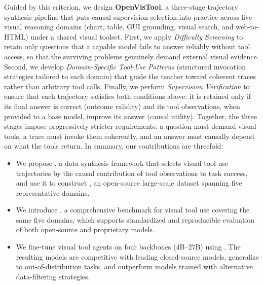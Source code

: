 Guided by this criterion, we design \textbf{OpenVisTool}, a three-stage trajectory synthesis pipeline that puts causal supervision selection into practice across five visual reasoning domains (chart, table, GUI grounding, visual search, and web-to-HTML) under a shared visual toolset. 
First, we apply \textit{Difficulty Screening} to retain only questions that a capable model fails to answer reliably without tool access, so that the surviving problems genuinely demand external visual evidence.
Second, we develop \textit{Domain-Specific Tool-Use Patterns} (structured invocation strategies tailored to each domain) that guide the teacher toward coherent traces rather than arbitrary tool calls.
Finally, we perform \textit{Supervision Verification} to ensure that each trajectory satisfies both conditions above: it is retained only if its final answer is correct (outcome validity) and its tool observations, when provided to a base model, improve its answer (causal utility).
Together, the three stages impose progressively stricter requirements: a question must demand visual tools, a trace must invoke them coherently, and an answer must causally depend on what the tools return.
In summary, our contributions are threefold:
\begin{itemize}
    \item We propose \textbf{\method}, a data synthesis framework that selects visual tool-use trajectories by the causal contribution of tool observations to task success, and use it to construct \textbf{\dataset}, an open-source large-scale dataset spanning five representative domains.
    \item We introduce \textbf{\benchname}, a comprehensive benchmark for visual tool use covering the same five domains, which supports standardized and reproducible evaluation of both open-source and proprietary models.
    \item We fine-tune visual tool agents on four backbones (4B–27B) using \dataset. The resulting models are competitive with leading closed-source models, generalize to out-of-distribution tasks, and outperform models trained with alternative data-filtering strategies.
\end{itemize}
